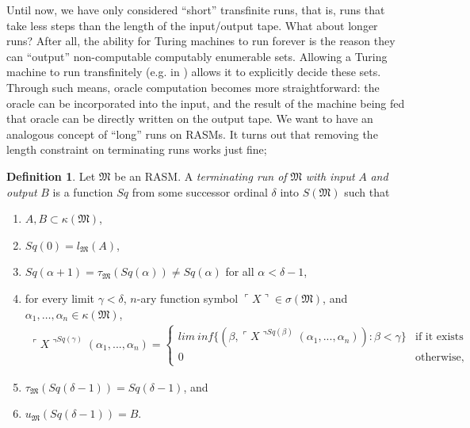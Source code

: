 \documentclass[12pt, twoside]{memoir}
\numberwithin{equation}{section}
\theoremstyle{definition}
\newtheorem{defi}[thm]{Definition}
\theoremstyle{remark}
\theoremstyle{definition}
\theoremstyle{definition}
\theoremstyle{definition}
\theoremstyle{remark}
\begin{document}
Until now, we have only considered ``short'' transfinite runs, that is, runs that take less steps than the length of the input/output tape. What about longer runs? After all, the ability for Turing machines to run forever is the reason they can ``output'' non-computable computably enumerable sets. Allowing a Turing machine to run transfinitely (e.g. in \cite{ittm}) allows it to explicitly decide these sets. Through such means, oracle computation becomes more straightforward: the oracle can be incorporated into the input, and the result of the machine being fed that oracle can be directly written on the output tape. We want to have an analogous concept of ``long'' runs on RASMs. It turns out that removing the length constraint on terminating runs works just fine; 

\begin{defi}\label{def242}
Let $\mathfrak{M}$ be an RASM. A \emph{terminating run of} $\mathfrak{M}$ \emph{with input} $A$ \emph{and output} $B$ is a function $Sq$ from some successor ordinal $\delta$ into $S(\mathfrak{M})$ such that 
\begin{enumerate}[label=(\alph*)]
    \item $A, B \subset \kappa(\mathfrak{M})$,
    \item $Sq(0) = l_{\mathfrak{M}}(A)$,
    \item $Sq(\alpha + 1) = \tau_{\mathfrak{M}}(Sq(\alpha)) \neq Sq(\alpha)$ for all $\alpha < \delta - 1$,
    \item for every limit $\gamma < \delta$, $n$-ary function symbol $\ulcorner X \urcorner \in \sigma(\mathfrak{M})$, and $\alpha_1, \dots, \alpha_n \in \kappa(\mathfrak{M})$,
    \begin{gather*}
        \ulcorner X \urcorner^{Sq(\gamma)} (\alpha_1, ..., \alpha_n) \! = \! 
        \begin{cases}
            lim \ inf \{(\beta, \ulcorner X \urcorner^{Sq(\beta)}(\alpha_1, ..., \alpha_n)) \! : \! \beta < \gamma\} & \!\!\!\! \text{if it exists} \\
            0 & \!\!\!\! \text{otherwise,}
        \end{cases} 
    \end{gather*}
    \item $\tau_{\mathfrak{M}}(Sq(\delta - 1)) = Sq(\delta - 1)$, and
    \item $u_{\mathfrak{M}}(Sq(\delta - 1)) = B$.
\end{enumerate}
\end{defi}
\end{document}
